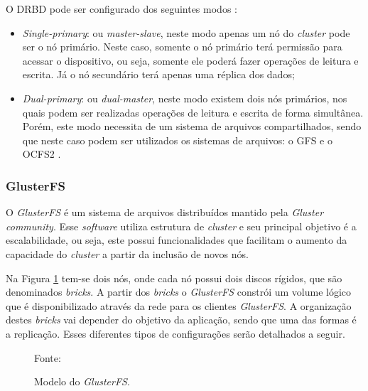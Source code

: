 O \ac{DRBD} pode ser configurado dos seguintes modos \cite{drbd}:
\begin{itemize}
 \item \textit{Single-primary}: ou \textit{master-slave}, neste modo apenas um nó do \textit{cluster} pode ser o nó primário. Neste caso, somente
 o nó primário terá permissão para acessar o dispositivo, ou seja, somente ele poderá fazer operações de leitura e escrita. Já o nó 
 secundário terá apenas uma réplica dos dados;
 \item \textit{Dual-primary}: ou \textit{dual-master}, neste modo existem dois nós primários, nos quais podem ser realizadas operações de leitura e 
 escrita de forma simultânea. Porém, este modo necessita de um sistema de arquivos compartilhados, sendo que neste caso podem ser utilizados os 
 sistemas de arquivos: o \ac{GFS} \cite{gfs} e o \ac{OCFS2} \cite{ocfs2}.
\end{itemize}

\subsubsection{GlusterFS}
\label{section:glusterfs}
O \textit{GlusterFS} \cite{glusterfs} é um sistema de arquivos distribuídos mantido pela \textit{Gluster community}. Esse \textit{software} 
utiliza estrutura de \textit{cluster} e seu principal objetivo é a escalabilidade, ou seja, este possui funcionalidades que facilitam o aumento
da capacidade do \textit{cluster} a partir da inclusão de novos nós.

Na Figura \ref{fig:glusterfs} tem-se dois nós, onde cada nó possui dois discos rígidos, que são denominados \textit{bricks}. 
A partir dos \textit{bricks} o \textit{GlusterFS} constrói um volume lógico que é disponibilizado através da rede para os clientes 
\textit{GlusterFS}. A organização destes \textit{bricks} vai depender do objetivo da aplicação, sendo que uma das formas é a replicação. Esses 
diferentes tipos de configurações serão detalhados a seguir.

\begin{figure}[h!]
 \centering
 \caption{Modelo do \textit{GlusterFS}.}
 Fonte: \citet{davies2013}
 \label{fig:glusterfs}
\end{figure}

